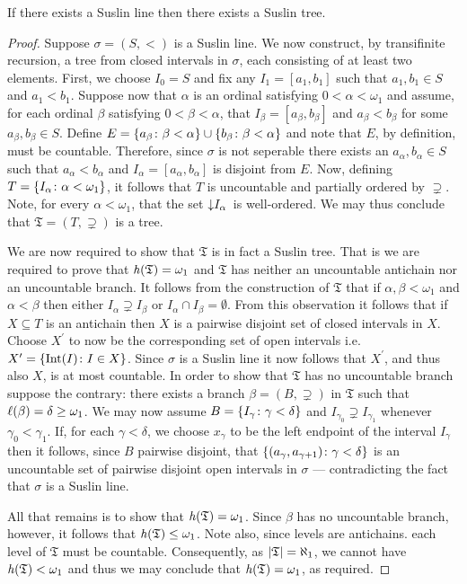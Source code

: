 \begin{lem}\label{lem:ltree}
	If there exists a Suslin line then there exists a Suslin tree.
\end{lem}
\begin{proof}
	Suppose $\sigma=(S,<)$ is a Suslin line.  We now construct, by transifinite recursion, a tree from closed intervals in $\sigma$, each consisting of at least two elements.  First, we choose $I_0=S$ and fix any $I_1=[a_1,b_1]$ such that $a_1,b_1\in S$ and $a_1<b_1$.  Suppose now that $\alpha$ is an ordinal satisfying $0<\alpha<\omega_1$ and assume, for each ordinal $\beta$ satisfying $0<\beta<\alpha$, that $I_\beta=[a_\beta,b_\beta]$ and $a_\beta<b_\beta$ for some $a_\beta,b_\beta\in S$.  Define $E=\lbrace a_\beta\colon \beta<\alpha \rbrace\cup\lbrace b_\beta\colon \beta<\alpha \rbrace$ and note that $E$, by definition, must be countable.  Therefore, since $\sigma$ is not seperable there exists an $a_\alpha,b_\alpha\in S$ such that $a_\alpha<b_\alpha$ and $I_\alpha=[a_\alpha,b_\alpha]$ is disjoint from $E$.  Now, defining $T=\lbrace I_\alpha\colon \alpha<\omega_1 \rbrace$, it follows that $T$ is uncountable and partially ordered by $\supsetneq$.  Note, for every $\alpha<\omega_1$, that the set $\left\downarrow I_\alpha\right.$ is well-ordered.  We may thus conclude that $\mathfrak{T}=(T,\supsetneq)$ is a tree.

	We are now required to show that $\mathfrak{T}$ is in fact a Suslin tree.  That is we are required to prove that $\mathit{h}(\mathfrak{T})=\omega_1$ and $\mathfrak{T}$ has neither an uncountable antichain nor an uncountable branch.  It follows from the construction of $\mathfrak{T}$ that if $\alpha,\beta<\omega_1$ and $\alpha<\beta$ then either $I_\alpha\supsetneq I_\beta$ or $I_\alpha\cap I_\beta=\emptyset$.  From this observation it follows that if $X\subseteq T$ is an antichain then $X$ is a pairwise disjoint set of closed intervals in $X$.  Choose $X^\prime$ to now be the corresponding set of open intervals i.e.\ $X^\prime=\lbrace \operatorname{Int}(I)\colon I\in X \rbrace$.  Since $\sigma$ is a Suslin line it now follows that $X^\prime$, and thus also $X$, is at most countable.  In order to show that $\mathfrak{T}$ has no uncountable branch suppose the contrary: there exists a branch $\beta=(B,\supsetneq)$ in $\mathfrak{T}$ such that $\ell(\beta)=\delta\geq\omega_1$.  We may now assume $B=\lbrace I_\gamma\colon \gamma<\delta \rbrace$ and $I_{\gamma_0}\supsetneq I_{\gamma_1}$ whenever $\gamma_0<\gamma_1$.  If, for each $\gamma<\delta$, we choose $x_\gamma$ to be the left endpoint of the interval $I_\gamma$ then it follows, since $B$ pairwise disjoint, that $\lbrace (a_\gamma,a_{\gamma+1})\colon \gamma<\delta \rbrace$ is an uncountable set of pairwise disjoint open intervals in $\sigma$ --- contradicting the fact that $\sigma$ is a Suslin line.

	All that remains is to show that $\mathit{h}(\mathfrak{T})=\omega_1$.  Since $\beta$ has no uncountable branch, however, it follows that $\mathit{h}(\mathfrak{T})\leq\omega_1$.  Note also, since levels are antichains. each level of $\mathfrak{T}$ must be countable.  Consequently, as $\left\lvert\mathfrak{T}\right\rvert=\aleph_1$, we cannot have $\mathit{h}(\mathfrak{T})<\omega_1$ and thus we may conclude that $\mathit{h}(\mathfrak{T})=\omega_1$, as required.
\end{proof}


